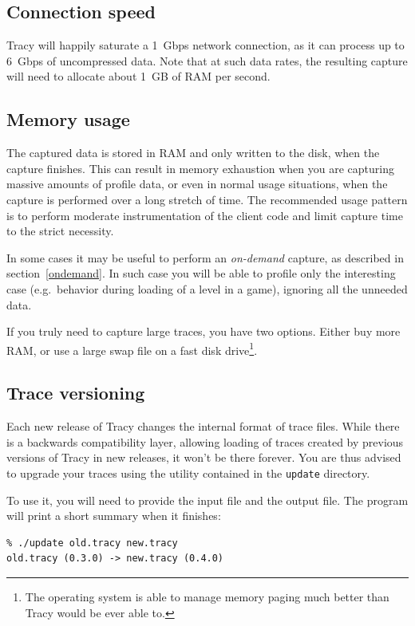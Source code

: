 \documentclass[hidelinks,titlepage,a4paper]{article}
\begin{document}
\subsection{Connection speed}

Tracy will happily saturate a 1~Gbps network connection, as it can process up to 6~Gbps of uncompressed data. Note that at such data rates, the resulting capture will need to allocate about 1~GB of RAM per second.

\subsection{Memory usage}

The captured data is stored in RAM and only written to the disk, when the capture finishes. This can result in memory exhaustion when you are capturing massive amounts of profile data, or even in normal usage situations, when the capture is performed over a long stretch of time. The recommended usage pattern is to perform moderate instrumentation of the client code and limit capture time to the strict necessity.

In some cases it may be useful to perform an \emph{on-demand} capture, as described in section~\ref{ondemand}. In such case you will be able to profile only the interesting case (e.g.\ behavior during loading of a level in a game), ignoring all the unneeded data.

If you truly need to capture large traces, you have two options. Either buy more RAM, or use a large swap file on a fast disk drive\footnote{The operating system is able to manage memory paging much better than Tracy would be ever able to.}.

\subsection{Trace versioning}

Each new release of Tracy changes the internal format of trace files. While there is a backwards compatibility layer, allowing loading of traces created by previous versions of Tracy in new releases, it won't be there forever. You are thus advised to upgrade your traces using the utility contained in the \texttt{update} directory.

To use it, you will need to provide the input file and the output file. The program will print a short summary when it finishes:

\begin{verbatim}
% ./update old.tracy new.tracy
old.tracy (0.3.0) -> new.tracy (0.4.0)
\end{verbatim}
\end{document}
